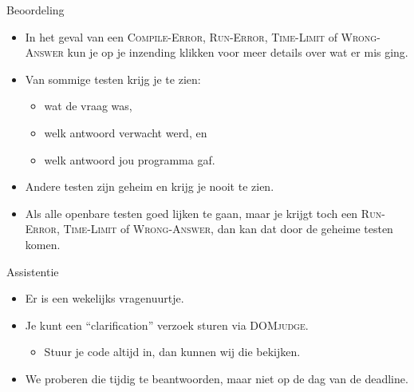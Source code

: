 \documentclass[serif,professionalfont]{beamer}
\newcommand{\DOMjudge}{\textsc{DOMjudge}\xspace}
\begin{document}
\begin{frame}{Beoordeling}

    \begin{itemize}
    
        \item In het geval van een \textsc{Compile-Error}, \textsc{Run-Error}, \textsc{Time-Limit} of \textsc{Wrong-Answer} kun je op je inzending klikken voor meer details over wat er mis ging.
        
        \item Van sommige testen krijg je te zien:
        
            \begin{itemize}
            
                \item wat de vraag was,
                \item welk antwoord verwacht werd, en
                \item welk antwoord jou programma gaf.
             
            \end{itemize}
        
        \item Andere testen zijn geheim en krijg je nooit te zien.
        
        \item Als alle openbare testen goed lijken te gaan, maar je krijgt toch een \textsc{Run-Error}, \textsc{Time-Limit} of \textsc{Wrong-Answer}, dan kan dat door de geheime testen komen.
    
    \end{itemize}

\end{frame}

\begin{frame}{Assistentie}

    \begin{itemize}
    
        \item Er is een wekelijks vragenuurtje.
        
        \item Je kunt een ``clarification'' verzoek sturen via \DOMjudge.
        
            \begin{itemize}
            
                \item Stuur je code altijd in, dan kunnen wij die bekijken.
            
            \end{itemize}
        
        \item We proberen die tijdig te beantwoorden, maar niet op de dag van de deadline.
    
    \end{itemize}

\end{frame}
\end{document}
